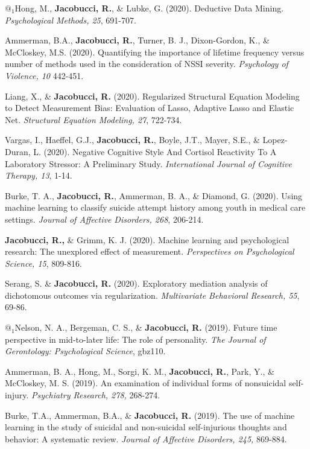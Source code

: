 \documentclass[letterpaper,10pt]{article}
\begin{document}
\begin{etaremune}
	\item  $@_1$Hong, M., \textbf{Jacobucci, R.}, \& Lubke, G. (2020). Deductive Data Mining. \emph{Psychological Methods, 25}, 691-707.
	\item  Ammerman, B.A., \textbf{Jacobucci, R.}, Turner, B. J., Dixon-Gordon, K., \& McCloskey, M.S. (2020). Quantifying the importance of lifetime frequency versus number of methods used in the consideration of NSSI severity. \emph{Psychology of Violence, 10} 442-451.
	\item Liang, X., \& \textbf{Jacobucci, R.} (2020). Regularized Structural Equation Modeling to Detect Measurement Bias: Evaluation of Lasso, Adaptive Lasso and Elastic Net. \emph{Structural Equation Modeling, 27}, 722-734.
	\item Vargas, I., Haeffel, G.J., \textbf{Jacobucci, R.}, Boyle, J.T., Mayer, S.E., \& Lopez-Duran, L. (2020). Negative Cognitive Style And Cortisol Reactivity To A Laboratory Stressor: A Preliminary Study. \emph{International Journal of Cognitive Therapy, 13}, 1-14. 
	\item Burke, T. A., \textbf{Jacobucci, R.}, Ammerman, B. A., \& Diamond, G. (2020). Using machine learning to classify suicide attempt history among youth in medical care settings. \emph{Journal of Affective Disorders, 268}, 206-214.
	\item  \textbf{Jacobucci, R.,} \& Grimm, K. J. (2020). Machine learning and psychological research: The unexplored effect of measurement. \emph{Perspectives on Psychological Science, 15}, 809-816.
	\item Serang, S. \& \textbf{Jacobucci, R.} (2020). Exploratory mediation analysis of dichotomous outcomes via regularization. \emph{Multivariate Behavioral Research, 55}, 69-86.
	\item  $@_1$Nelson, N. A., Bergeman, C. S., \& \textbf{Jacobucci, R.} (2019). Future time perspective in mid-to-later life: The role of personality. \emph{The Journal of Gerontology: Psychological Science}, gbz110.
	\item  Ammerman, B. A., Hong, M., Sorgi, K. M., \textbf{Jacobucci, R.}, Park, Y., \& McCloskey, M. S. (2019). An examination of individual forms of nonsuicidal self-injury. \emph{Psychiatry Research, 278,} 268-274.
	\item  Burke, T.A., Ammerman, B.A., \& \textbf{Jacobucci, R.} (2019). The use of machine learning in the study of suicidal and non-suicidal self-injurious thoughts and behavior: A systematic review. \emph{Journal of Affective Disorders, 245,} 869-884.

\end{etaremune}
\end{document}

